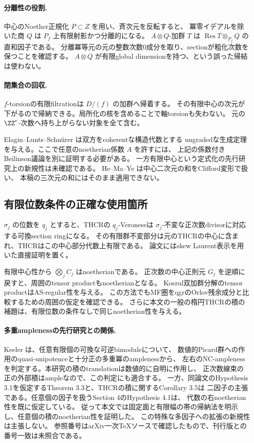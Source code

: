 \paragraph{分離性の役割.}
中心のNoether正規化 \(P\subset Z\) を用い、斉次元を反転すると、
冪零イデアルを除いた商 \(Q\) は \(P_f\) 上有限射影かつ分離的になる。
\(A\otimes Q\)-加群 \(T\) は \(\operatorname{Res}T\otimes_{P_f}Q\) の直和因子である。
分離冪等元の元の整数次数0成分を取り、sectionが粗化次数を保つことを確認する。
\(A\otimes Q\) が有限global dimensionを持つ、という誤った帰結は使わない。

\paragraph{閉集合の回収.}
\(f\)-torsionの有限filtrationは \(D/(f)\) の加群へ帰着する。
その有限中心の次元が下がるので帰納できる。局所化の核を含めることで軸torsionも失わない。
元の \(\ZZ^r\)-次数へ持ち上がらない対象を全て含む。

Elagin--Lunts--Schn\"urer \cite[Theorem 4.18]{ELS} は双方をcoherentな構造代数とする
ungradedな生成定理を与える。ここで任意のnoetherian係数 \(A\) を許すには、
上記の係数付きBeilinson議論を別に証明する必要がある。
一方有限中心という定式化の先行研究上の新規性は未確認である。
He--Ma--Ye \cite{HMY} は中心二次元の和をClifford変形で扱い、
本稿の三次元の和にはそのまま適用できない。

\subsection{有限位数条件の正確な使用箇所}

\(\sigma_j\) の位数を \(q_j\) とすると、THCRの \(q_j\)-Veroneseは
\(\sigma_j\)-不変な正次数divisorに対応する可換section ringになる。
その有限群不変部分は元のTHCRの中心に含まれ、THCRはこの中心部分代数上有限である。
論文にはskew Laurent表示を用いた直接証明を置く。

有限中心性から \(\bigotimes_jC_j\) はnoetherianである。
正次数の中心正則元 \(G_j\) を逆順に戻すと、周囲のtensor productもnoetherianとなる。
Koszul双加群分解のtensor productはAS-regular性を与える。
この方法でもMF圏をqgrのOrlov残余成分と比較するための周囲の仮定を確認できる。
さらに本文の一般の楕円THCRの積の補題は、有限位数の条件なしで同じnoetherian性を与える。

\paragraph{多重amplenessの先行研究との関係.}
Keeler \cite[Theorem 2.7, Corollary 2.8]{KeelerMulti} は、任意有限個の可換な可逆bimoduleについて、
数値的Picard群への作用のquasi-unipotenceと十分正の多重冪のamplenessから、
左右のNC-amplenessを判定する。本研究の積のtranslationは数値的に自明に作用し、
正次数線束の正の外部積はampleなので、この判定にも適合する。
一方、同論文のHypothesis 3.1を仮定するTheorem 3.3と、THCRの積に関するCorollary 3.5は
二因子の主張である。任意個の因子を扱うSection 4のHypothesis 4.1は、
代数の右noetherian性を既に仮定している。
従って本文では固定面と有限幅の帯の帰納法を明示し、任意個の積のnoetherian性を証明した。
この特殊な多因子への拡張の新規性は主張しない。
参照番号はarXiv一次TeXソースで確認したもので、刊行版との番号一致は未照合である。

